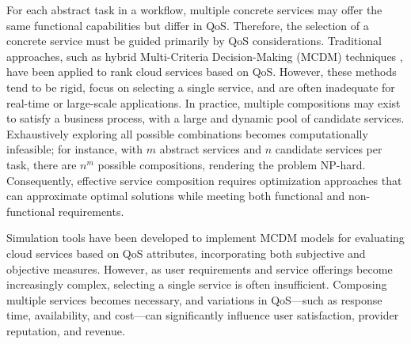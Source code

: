 \documentclass[3p,twocolumn]{elsarticle}
\theoremstyle{thmstyleone}%
\theoremstyle{thmstyletwo}%
\theoremstyle{thmstylethree}%
\begin{document}
For each abstract task in a workflow, multiple concrete services may offer the same functional capabilities but differ in QoS. Therefore, the selection of a concrete service must be guided primarily by QoS considerations. Traditional approaches, such as hybrid Multi-Criteria Decision-Making (MCDM) techniques \cite{kumar2018multi, kumar2018novel, liu2016decision}, have been applied to rank cloud services based on QoS. However, these methods tend to be rigid, focus on selecting a single service, and are often inadequate for real-time or large-scale applications. In practice, multiple compositions may exist to satisfy a business process, with a large and dynamic pool of candidate services. Exhaustively exploring all possible combinations becomes computationally infeasible; for instance, with $m$ abstract services and $n$ candidate services per task, there are $n^m$ possible compositions, rendering the problem NP-hard. Consequently, effective service composition requires optimization approaches that can approximate optimal solutions while meeting both functional and non-functional requirements.


Simulation tools have been developed to implement MCDM models for evaluating cloud services based on QoS attributes, incorporating both subjective and objective measures. However, as user requirements and service offerings become increasingly complex, selecting a single service is often insufficient. Composing multiple services becomes necessary, and variations in QoS—such as response time, availability, and cost—can significantly influence user satisfaction, provider reputation, and revenue.
\end{document}
